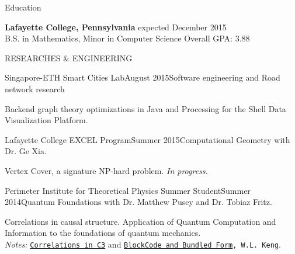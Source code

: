 \documentclass{resume} %
\begin{document}
\begin{rSection}{Education}

{\bf Lafayette College, Pennsylvania} \hfill expected December 2015\\ 
B.S. in Mathematics, Minor in Computer Science \hfill Overall GPA: 3.88
\end{rSection}


\begin{rSection}{RESEARCHES \& ENGINEERING}

\begin{rSubsection}{Singapore-ETH Smart Cities Lab}{August 2015}{Software engineering and Road network research}{}
\item Backend graph theory optimizations in Java and Processing for the Shell Data Visualization Platform.

\end{rSubsection}

\begin{rSubsection}{Lafayette College EXCEL Program}{Summer 2015}{Computational Geometry with Dr. Ge Xia.}{}
\item Vertex Cover, a signature NP-hard problem. {\em In progress.}
\end{rSubsection}



\begin{rSubsection}{Perimeter Institute for Theoretical Physics Summer Student}{Summer 2014}{Quantum Foundations with Dr. Matthew Pusey and Dr. Tobiaz Fritz.}{}
\item Correlations in causal structure. Application of Quantum Computation and Information to the foundations of quantum mechanics. \\
{\em Notes:} {\tt \href{https://github.com/kengz/Quantum-Foundations-Correlations/blob/master/Keng%20Correlations%20in%20C3.pdf}{\textcolor{Cerulean}{Correlations in C3}}} and {\tt \href{https://github.com/kengz/Quantum-Foundations-Correlations/blob/master/Keng%20blockcode.pdf}{\textcolor{Cerulean}{BlockCode and Bundled Form}}, W.L. Keng}.
\end{rSubsection}


\end{rSection}
\end{document}
